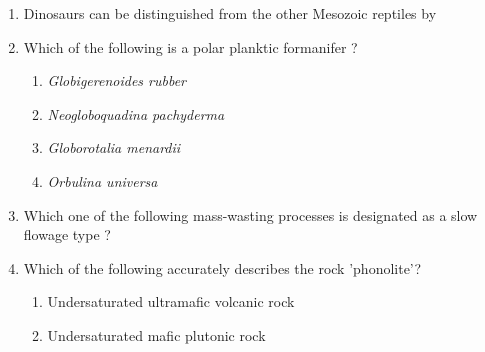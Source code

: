 \documentclass[journal,12pt,onecolumn,fleqn]{IEEEtran}
\theoremstyle{remark}
\theoremstyle{remark}
\begin{document}
\begin{enumerate}[label=Q.\arabic*.]
\begin {enumerate}
            \end{enumerate}
    \item Dinosaurs can be distinguished from the other Mesozoic reptiles by \hfill{} 
        \begin {enumerate}
            \end{enumerate}
    \item Which of the following is a polar planktic formanifer ? \hfill{} 
            \begin{enumerate}
                \item \textit{Globigerenoides rubber}
                \item \textit{Neogloboquadina pachyderma}
                \item \textit{Globorotalia menardii}
                \item \textit{Orbulina universa}                
            \end{enumerate}
    \item Which one of the following mass-wasting processes is designated as a slow flowage type ? \hfill{} 
    \begin {enumerate}
            \end{enumerate}
    \item Which of the following accurately describes the rock 'phonolite'? \hfill{} 
    \begin{enumerate}
                \item Undersaturated ultramafic volcanic rock
                \item Undersaturated mafic plutonic rock

\end{enumerate}
\end{enumerate}
\end{document}
